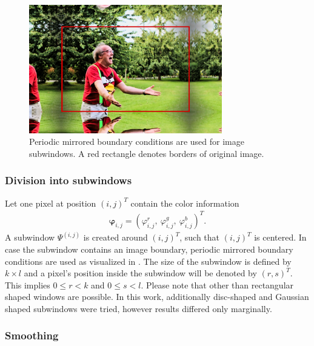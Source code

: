 \begin{figure}
    \centering
    \includegraphics[width=0.75\textwidth]{./figures/sensor/method_boundaryconditions.jpg}
    \caption{Periodic mirrored boundary conditions are used for image subwindows. A red rectangle denotes borders of original image.}
    \label{fig:method_boundaryconditions}
\end{figure}





\subsubsection{Division into subwindows} 

Let one pixel at position $(i, j)^T$ contain the color information
\begin{eqnarray}
   \bm{\varphi}_{i,j} = ( \varphi_{i,j}^r,\ \varphi_{i,j}^g,\ \varphi_{i,j}^b )^T. 
\end{eqnarray}
A subwindow $\Psi^{\left(i,j\right)}$ is created around $(i, j)^T$, such that $(i, j)^T$ is centered. 
In case the subwindow contains an image boundary, periodic mirrored boundary conditions are used as visualized in . 
The size of the subwindow is defined by $k \times l$ and a pixel's position inside the subwindow will be denoted by $(r, s)^T$.
This implies $0 \leq r < k$ and $0 \leq s < l$. 
Please note that other than rectangular shaped windows are possible.
In this work, additionally disc-shaped and Gaussian shaped subwindows were tried, however results differed only marginally.





\subsubsection{Smoothing} 

